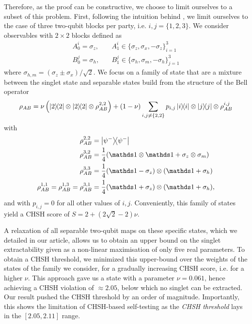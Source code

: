 Therefore, as the proof can be constructive, we choose to limit ourselves to a subset of this problem.
First, following the intuition behind \cite{Coopmans19}, we limit ourselves to the case of three two-qubit blocks per party, i.e. $i,j=\{1,2,3\}$.
We consider observables with $2 \times 2$ blocks defined as 
\begin{equation}
	\begin{split}
		A_0^i = \sigma_z, &\quad A_1^i \in \{\sigma_z,\sigma_x,-\sigma_z\}_{i=1}^3  \\
		B_0^j = \sigma_h, &\quad B_1^j \in \{\sigma_h,\sigma_m,-\sigma_h\}_{j=1}^3 
	\end{split}
\end{equation}
where $\sigma_{h,m} = (\sigma_z\pm\sigma_x)/\sqrt{2}$.
We focus on a family of state that are a mixture between the singlet state and separable states build from the structure of the Bell operator
\begin{equation}
	\rho_{AB} = \nu \left(\ketbra{2} \otimes \ketbra{2} \otimes \rho_{AB}^{2,2}\right) 
	+ (1-\nu) \sum_{i,j \neq \{2,2\}} p_{i,j} \ketbra{i} \otimes \ketbra{j} \otimes \rho_{AB}^{i,j}
\end{equation}
with 
\begin{equation}
	\begin{split}
    \rho_{AB}^{2,2}&=\ketbra{\psi^-} \\
    \rho_{AB}^{3,2}&= \frac{1}{4}(\id\otimes \id +\sigma_z\otimes \sigma_m)\\
    \rho_{AB}^{3,3}&= \frac{1}{4}(\id-\sigma_z)\otimes(\id+\sigma_h)\\
    \rho_{AB}^{1,1}=\rho_{AB}^{1,3}=\rho_{AB}^{3,1} &= \frac{1}{4}(\id+\sigma_z)\otimes(\id+\sigma_h),
	\end{split}	
\end{equation}
and with $p_{i,j} =0$ for all other values of $i,j$.
Conveniently, this family of states yield a CHSH score of $S=2+(2\sqrt{2}-2)\nu$.

A relaxation of all separable two-qubit maps on these specific states, which we detailed in our article, allows us to obtain an upper bound on the singlet extractability given as a non-linear maximisation of only five real parameters.
To obtain a CHSH threshold, we minimized this upper-bound over the weights of the states of the family we consider, for a gradually increasing CHSH score, i.e. for a higher $\nu$.
This approach gave us a state with a parameter $\nu=0.061$, hence achieving a CHSH violation of $\approx 2.05$, below which no singlet can be extracted.
Our result pushed the CHSH threshold by an order of magnitude.
Importantly, this shows the limitation of CHSH-based self-testing as the \textit{CHSH threshold} lays in the $[2.05,2.11]$ range.


